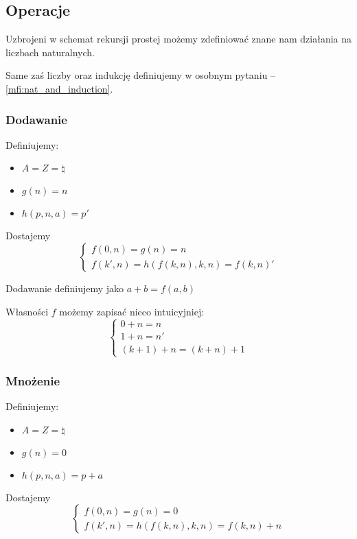 \subsection{Operacje}

Uzbrojeni w schemat rekursji prostej możemy zdefiniować znane nam działania na liczbach naturalnych.

Same zaś liczby oraz indukcję definiujemy w osobnym pytaniu -- \ref{mfi:nat_and_induction}.

\subsubsection{Dodawanie}

Definiujemy:
\begin{itemize}
    \item \( A = Z = \natural \)
    \item \( g(n) = n \)
    \item \( h(p, n, a) = p' \)
\end{itemize}

Dostajemy
\[
    \begin{cases}
        f(0, n) = g(n) = n \\
        f(k', n) = h(f(k, n), k, n) = f(k, n)'
    \end{cases}
\]

Dodawanie definiujemy jako \( a + b = f(a, b) \)

Własności \( f \) możemy zapisać nieco intuicyjniej:
\[
    \begin{cases}
        0 + n = n \\
        1 + n = n' \\
        (k + 1) + n = (k + n) + 1
    \end{cases}
\]


\subsubsection{Mnożenie}
Definiujemy:
\begin{itemize}
    \item \( A = Z = \natural \)
    \item \( g(n) = 0 \)
    \item \( h(p, n, a) = p + a \)
\end{itemize}

Dostajemy
\[
    \begin{cases}
        f(0, n) = g(n) = 0 \\
        f(k', n) = h(f(k, n), k, n) = f(k, n) + n
    \end{cases}
\]

